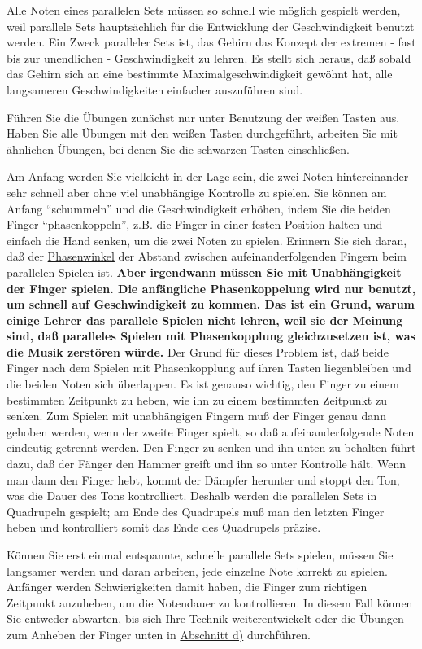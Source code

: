 Alle Noten eines parallelen Sets müssen so schnell wie möglich gespielt werden, weil parallele Sets hauptsächlich für die Entwicklung der Geschwindigkeit benutzt werden.
Ein Zweck paralleler Sets ist, das Gehirn das Konzept der extremen - fast bis zur unendlichen - Geschwindigkeit zu lehren.
Es stellt sich heraus, daß sobald das Gehirn sich an eine bestimmte Maximalgeschwindigkeit gewöhnt hat, alle langsameren Geschwindigkeiten einfacher auszuführen sind.

Führen Sie die Übungen zunächst nur unter Benutzung der weißen Tasten aus.
Haben Sie alle Übungen mit den weißen Tasten durchgeführt, arbeiten Sie mit ähnlichen Übungen, bei denen Sie die schwarzen Tasten einschließen.

Am Anfang werden Sie vielleicht in der Lage sein, die zwei Noten hintereinander sehr schnell aber ohne viel unabhängige Kontrolle zu spielen.
Sie können am Anfang \enquote{schummeln} und die Geschwindigkeit erhöhen, indem Sie die beiden Finger \enquote{phasenkoppeln}, z.B. die Finger in einer festen Position halten und einfach die Hand senken, um die zwei Noten zu spielen.
Erinnern Sie sich daran, daß der \hyperref[c1iv2a]{Phasenwinkel} der Abstand zwischen aufeinanderfolgenden Fingern beim parallelen Spielen ist.
\textbf{Aber irgendwann müssen Sie mit Unabhängigkeit der Finger spielen.
Die anfängliche Phasenkoppelung wird nur benutzt, um schnell auf Geschwindigkeit zu kommen.
Das ist ein Grund, warum einige Lehrer das parallele Spielen nicht lehren, weil sie der Meinung sind, daß paralleles Spielen mit Phasenkopplung gleichzusetzen ist, was die Musik zerstören würde.}
Der Grund für dieses Problem ist, daß beide Finger nach dem Spielen mit Phasenkopplung auf ihren Tasten liegenbleiben und die beiden Noten sich überlappen.
Es ist genauso wichtig, den Finger zu einem bestimmten Zeitpunkt zu heben, wie ihn zu einem bestimmten Zeitpunkt zu senken.
Zum Spielen mit unabhängigen Fingern muß der Finger genau dann gehoben werden, wenn der zweite Finger spielt, so daß aufeinanderfolgende Noten eindeutig getrennt werden.
Den Finger zu senken und ihn unten zu behalten führt dazu, daß der Fänger den Hammer greift und ihn so unter Kontrolle hält.
Wenn man dann den Finger hebt, kommt der Dämpfer herunter und stoppt den Ton, was die Dauer des Tons kontrolliert.
Deshalb werden die parallelen Sets in Quadrupeln gespielt; am Ende des Quadrupels muß man den letzten Finger heben und kontrolliert somit das Ende des Quadrupels präzise.

Können Sie erst einmal entspannte, schnelle parallele Sets spielen, müssen Sie langsamer werden und daran arbeiten, jede einzelne Note korrekt zu spielen.
Anfänger werden Schwierigkeiten damit haben, die Finger zum richtigen Zeitpunkt anzuheben, um die Notendauer zu kontrollieren.
In diesem Fall können Sie entweder abwarten, bis sich Ihre Technik weiterentwickelt oder die Übungen zum Anheben der Finger unten in \hyperref[c1iii7d]{Abschnitt d)} durchführen.


